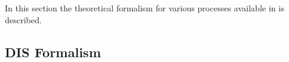 

%
In this section the theoretical formalism for various processes available in \fitter is described.



\subsection{DIS Formalism}
\label{dissection}



